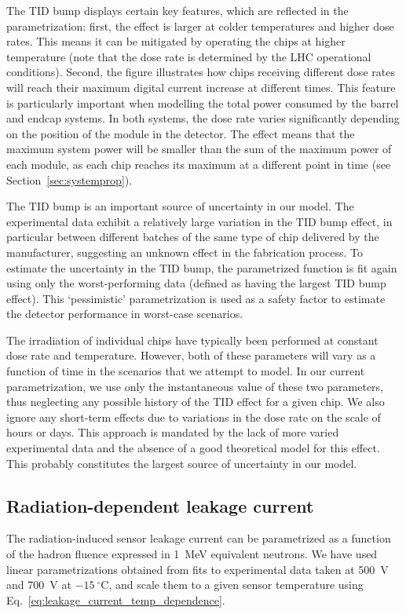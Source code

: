 The TID bump displays certain key features, which are reflected in the parametrization:
first, the effect is larger at colder temperatures and higher dose rates. This means it can be
mitigated by operating the chips at higher temperature (note that the dose rate is determined by the LHC operational conditions).
Second, the figure illustrates how chips receiving different dose rates will reach their maximum
digital current increase at different times. This feature is particularly important when modelling the
total power consumed by the barrel and endcap systems. In both systems, the dose rate varies significantly
depending on the position of the module in the detector. The effect means that the maximum system
power will be smaller than the sum of the maximum power of each module, as each chip reaches
its maximum at a different point in time (see Section~\ref{sec:systemprop}).

The TID bump is an important source of uncertainty in our model. The experimental data exhibit
a relatively large variation in the TID bump effect, in particular
between different batches of the same type of chip delivered by the manufacturer, suggesting an unknown
effect in the fabrication process. To estimate the uncertainty in the TID bump,
the parametrized function is fit again using only the worst-performing data (defined as having the
largest TID bump effect). This `pessimistic' parametrization is used as a safety factor to estimate
the detector performance in worst-case scenarios.

The irradiation of individual chips have typically been performed at constant dose rate and temperature.
However, both of these parameters will vary as a function of time in the scenarios that we attempt to model.
In our current parametrization, we use only the instantaneous value of these two parameters, thus neglecting any possible history of the TID effect for a given chip. We also ignore any short-term effects due to variations in the dose rate on the scale of hours or days. This approach is mandated by the lack of more varied experimental data and the absence of a good theoretical model for this effect. This probably constitutes the largest source of uncertainty in our model.

\subsection{Radiation-dependent leakage current}

The radiation-induced sensor leakage current can be parametrized as a function of the hadron fluence expressed in 1~MeV equivalent neutrons.
We have used linear parametrizations obtained from fits to experimental data taken at 500~V and 700~V at $-15~^\circ$C, and scale them to a given sensor temperature using Eq.~\ref{eq:leakage_current_temp_dependence}.

